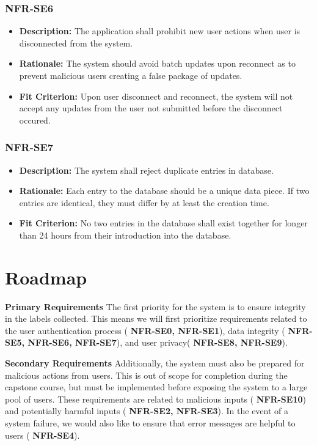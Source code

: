 \documentclass{article}
\begin{document}
\subsubsection*{NFR-SE6}
\begin{itemize}
  \item \textbf{Description:} The application shall prohibit new user actions when user is disconnected from the system.
  \item \textbf{Rationale:} The system should avoid batch updates upon reconnect as to prevent malicious users creating a false package of updates.
  \item \textbf{Fit Criterion:} Upon user disconnect and reconnect, the system will not accept any updates from the user not submitted before the disconnect occured.
\end{itemize}


\subsubsection*{NFR-SE7}
\begin{itemize}
  \item \textbf{Description:} The system shall reject duplicate entries in database.
  \item \textbf{Rationale:} Each entry to the database should be a unique data piece. If two entries are identical, they must differ by at least the creation time.
  \item \textbf{Fit Criterion:} No two entries in the database shall exist together for longer than 24 hours from their introduction into the database.
\end{itemize}



\section{Roadmap}

\textbf{Primary Requirements}
The first priority for the system is to ensure integrity in the labels collected. This means we will first prioritize requirements
related to the user authentication process (
\textbf{NFR-SE0, NFR-SE1}), data integrity (
  \textbf{NFR-SE5, NFR-SE6, NFR-SE7}), and user privacy(
    \textbf{NFR-SE8, NFR-SE9}).

\textbf{Secondary Requirements}
Additionally, the system must also be prepared for malicious actions from users. This is out of scope for completion during the capstone course, but must be implemented
before exposing the system to a large pool of users. These requirements are related to malicious inputs (
  \textbf{NFR-SE10}) and potentially harmful inputs (
    \textbf{NFR-SE2, NFR-SE3}). In the event of a system failure, we would also like to ensure that error messages are helpful to users (
      \textbf{NFR-SE4}).
\end{document}
